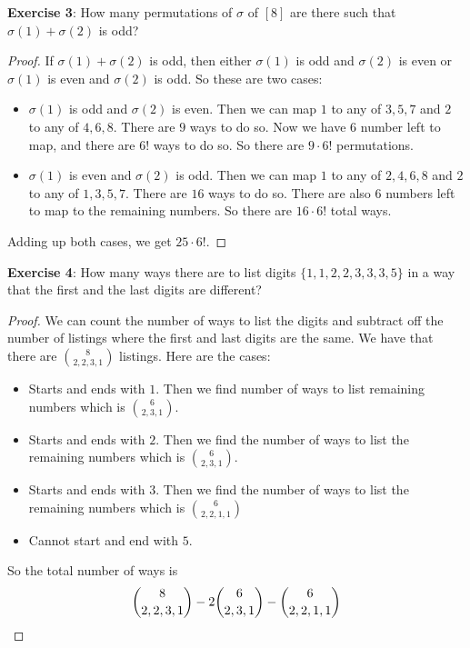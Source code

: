 \documentclass{article}
\begin{document}
\textbf{Exercise 3}: How many permutations of $\sigma$ of $[8]$ are there such that $\sigma(1) + \sigma(2)$ is odd?
    \begin{proof}
        If $\sigma(1) + \sigma(2)$ is odd, then either $\sigma(1)$ is odd and $\sigma(2)$ is even or $\sigma(1)$ is even and $\sigma(2)$ is odd. So these are two cases:
            \begin{itemize}
                \item $\sigma(1)$ is odd and $\sigma(2)$ is even. Then we can map $1$ to any of $3, 5, 7$ and $2$ to any of $4, 6, 8$. There are $9$ ways to do so. Now we have $6$ number left to map, and there are $6!$ ways to do so. So there are $9 \cdot 6!$ permutations.

                \item $\sigma(1)$ is even and $\sigma(2)$ is odd. Then we can map $1$ to any of $2, 4, 6, 8$ and $2$ to any of $1, 3, 5, 7$. There are $16$ ways to do so. There are also $6$ numbers left to map to the remaining numbers. So there are $16 \cdot 6!$ total ways.
            \end{itemize}
        Adding up both cases, we get $25 \cdot 6!$.
    \end{proof}

\textbf{Exercise 4}: How many ways there are to list digits $\{1, 1, 2, 2, 3, 3, 3, 5\}$ in a way that the first and the last digits are different?
    \begin{proof}
        We can count the number of ways to list the digits and subtract off the number of listings where the first and last digits are the same. We have that there are $\binom{8}{2, 2, 3, 1}$ listings. Here are the cases:
            \begin{itemize}
                \item Starts and ends with $1$. Then we find number of ways to list remaining numbers which is $\binom{6}{2, 3, 1}$.

                \item Starts and ends with $2$. Then we find the number of ways to list the remaining numbers which is $\binom{6}{2, 3, 1}$.

                \item Starts and ends with $3$. Then we find the number of ways to list the remaining numbers which is $\binom{6}{2, 2, 1, 1}$

                \item Cannot start and end with $5$.
            \end{itemize}
        So the total number of ways is
            \begin{equation*}
                \dbinom{8}{2, 2, 3, 1} - 2\dbinom{6}{2, 3, 1} - \dbinom{6}{2, 2, 1, 1}
            \end{equation*}
    \end{proof}
\end{document}
